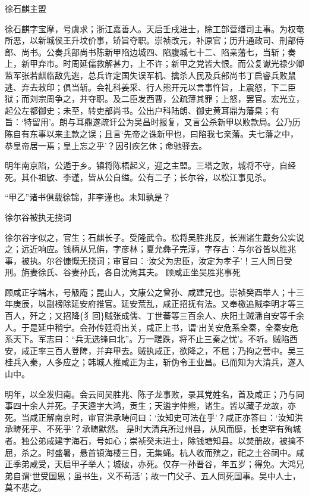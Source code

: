 \documentclass[]{article}
\begin{document}
徐石麒主盟

徐石麒字宝摩，号虞求；浙江嘉善人。天启壬戌进士，除工部营缮司主事。为权奄所恶，以新城侯王升坟价事，矫旨夺职。崇祯改元，补原官；历升通政司、刑部侍郎、尚书。公奏兵部尚书陈新甲陷边城四、陷腹城七十二、陷亲藩七，当斩；奏上，新甲弃市。时周延儒救解甚力，上不许；新甲之党皆大恨。而公复谳光禄少卿监军张若麒临敌先逃，总兵许定国失误军机、擒杀人民及兵部尚书丁启睿兵败鼠逃、弃去敕印；俱当斩。会礼科姜采、行人熊开元以言事忤旨，上震怒，下二臣狱；而刘宗周争之，并夺职。及二臣发西曹，公疏薄其罪；上怒，罢官。宏光立，起公左都御史；未至，转吏部尚书。公出户科陆朗、御史黄耳鼎为藩臬；有旨：`特留用'。朗与耳鼎遂疏讦公为吴昌时报复，又言公杀新甲以败款局。公乃历陈自有东事以来主款之误；且言`先帝之诛新甲也，曰陷我七亲藩。夫七藩之中，恭皇帝居一焉；皇上忘之乎'？因引疾乞休；命驰驿去。

明年南京陷，公遁于乡。镇将陈梧起义，迎之主盟。三塔之败，城将不守，自经死。其仆祖敏、李谨，皆从公自缢。公有二子；长尔谷，以松江事见杀。

``甲乙''诸书俱载徐锦，非李谨也。未知孰是？

徐尔谷被执无挠词

徐尔谷字似之，官生；石麒长子。受隆武令。松将吴胜兆反，长洲诸生戴务公实说之；远近响应。钱柄从兄旃，字彦林；夏允彝子完淳，字存古：与尔谷皆以胜兆事，被执。尔谷慷慨无挠词；审官曰：`汝父为忠臣，汝定为孝子'！三人同日受刑。旃妻徐氏、谷妻孙氏，各自沈殉其夫。
顾咸正坐吴胜兆事死

顾咸正字端木，号觙庵；昆山人，文康公之曾孙、咸建兄也。崇祯癸酉举人；十三年庚辰，以副榜除延安府推官。延安荒乱，咸正招抚有法。又奉檄追贼李明才等三百人，歼之；又招降\{犭回\}贼张成儒、丁世蕃等三百余人、庆阳土贼潘自安等千余人。于是延中稍宁。会孙传廷将出关，咸正上书，谓`出关安危系全秦，全秦安危系天下。军志曰：``兵无选锋曰北''。万一蹉跌，将不止三秦之忧'。不听。贼陷西安，咸正率三百人登陴，并弃甲去。贼执咸正，欲降之，不屈；乃拘之营中。吴三桂兵入秦，人多应之；韩城人推咸正为主，斩伪令王业昌。已而知为大清兵，遂入山中。

明年，以全发归南。会云间吴胜兆、陈子龙事败，录其党姓名，首及咸正；乃与同事四十余人并死。子天逵字大鸿，贡生；天遴字仲熊，诸生。皆以藏子龙故，亦死。当咸正解南京时，审官洪承畴问曰：`汝知史可法在乎'？咸正亦答曰：`汝知洪承畴死乎、不死乎'？承畴默然。
是时大清兵所过州县，从风而靡，长吏罕有殉城者。独公弟咸建字海石，号如心；崇祯癸未进士，除钱塘知县。以焚册故，被擒不屈，杀之。时盛暑，悬首镇海楼三日，无集蝇。杭人收而殡之，祀之土谷祠中。咸正季弟咸受，天启甲子举人；城破，亦死。仅存一孙晋谷，年五岁；得免。大鸿兄弟自谓`世受国恩；虽书生，义不苟活'；故一门父子、五人同死国事。吴中人士，莫不悲之。
\end{document}
